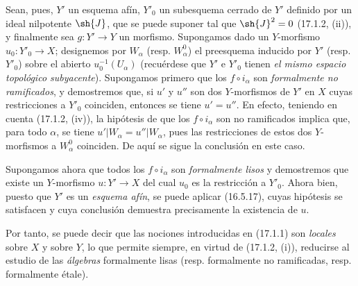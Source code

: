 Sean, pues, $Y'$ un esquema afín, $Y'_0$ un subesquema cerrado de $Y'$ definido por un ideal nilpotente $\sh{J}$, que se puede suponer tal que $\sh{J}^2=0$ (17.1.2, (ii)), y finalmente sea $g:Y'\to Y$ un morfismo. Supongamos dado un $Y$-morfismo $u_0:Y'_0\to X$; designemos por $W_\alpha$ (resp. $W^0_\alpha$) el preesquema inducido por $Y'$ (resp. $Y'_0$) sobre el abierto $u_0^{-1}(U_\alpha)$ (recuérdese que $Y'$ e $Y'_0$ tienen \emph{el mismo espacio topológico subyacente}). Supongamos primero que los $f\circ i_\alpha$ son \emph{formalmente no ramificados}, y demostremos que, si $u'$ y $u''$ son dos $Y$-morfismos de $Y'$ en $X$ cuyas restricciones a $Y'_0$ coinciden, entonces se tiene $u'=u''$. En efecto, teniendo en cuenta (17.1.2, (iv)), la hipótesis de que los $f\circ i_\alpha$ son no ramificados implica que, para todo $\alpha$, se tiene $u'|W_\alpha=u''|W_\alpha$, pues las restricciones de estos dos $Y$-morfismos a $W^0_\alpha$ coinciden. De aquí se sigue la conclusión en este caso.

Supongamos ahora que todos los $f\circ i_\alpha$ son \emph{formalmente lisos} y demostremos que existe un $Y$-morfismo $u:Y'\to X$ del cual $u_0$ es la restricción a $Y'_0$. Ahora bien, puesto que $Y'$ es un \emph{esquema afín}, se puede aplicar (16.5.17), cuyas hipótesis se satisfacen y cuya conclusión demuestra precisamente la existencia de $u$.

Por tanto, se puede decir que las nociones introducidas en (17.1.1) son \emph{locales} sobre $X$ y sobre $Y$, lo que permite siempre, en virtud de (17.1.2, (i)), reducirse al estudio de las \emph{álgebras} formalmente lisas (resp. formalmente no ramificadas, resp. formalmente étale).
